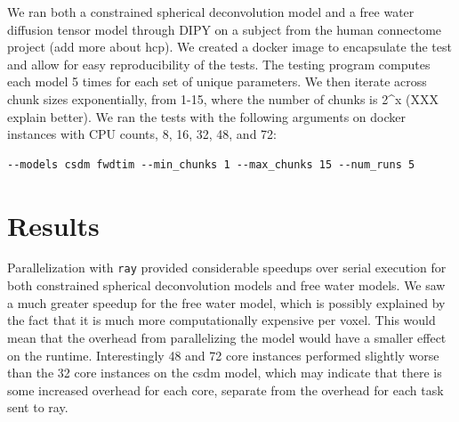 \documentclass[
  letterpaper,
  DIV=11,
  numbers=noendperiod]{scrartcl}
\begin{document}
We ran both a constrained spherical deconvolution model and a free water
diffusion tensor model through DIPY on a subject from the human
connectome project (add more about hcp). We created a docker image to
encapsulate the test and allow for easy reproducibility of the tests.
The testing program computes each model 5 times for each set of unique
parameters. We then iterate across chunk sizes exponentially, from 1-15,
where the number of chunks is 2\^{}x (XXX explain better). We ran the
tests with the following arguments on docker instances with CPU counts,
8, 16, 32, 48, and 72:

\begin{verbatim}
--models csdm fwdtim --min_chunks 1 --max_chunks 15 --num_runs 5
\end{verbatim}

\section{Results}\label{results}

Parallelization with \texttt{ray} provided considerable speedups over
serial execution for both constrained spherical deconvolution models and
free water models. We saw a much greater speedup for the free water
model, which is possibly explained by the fact that it is much more
computationally expensive per voxel. This would mean that the overhead
from parallelizing the model would have a smaller effect on the runtime.
Interestingly 48 and 72 core instances performed slightly worse than the
32 core instances on the csdm model, which may indicate that there is
some increased overhead for each core, separate from the overhead for
each task sent to ray.
\end{document}
